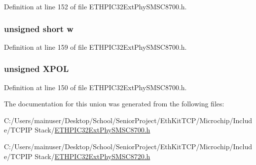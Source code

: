 Definition at line 152 of file E\+T\+H\+P\+I\+C32\+Ext\+Phy\+S\+M\+S\+C8700.\+h.

\hypertarget{union_____s_p_e_c_i_a_l_c_t_r_lbits__t_a160850a4684a3e82c2323033964f2e98}{}
\subsubsection[{w}]{\setlength{\rightskip}{0pt plus 5cm}unsigned short w}\label{union_____s_p_e_c_i_a_l_c_t_r_lbits__t_a160850a4684a3e82c2323033964f2e98}


Definition at line 159 of file E\+T\+H\+P\+I\+C32\+Ext\+Phy\+S\+M\+S\+C8700.\+h.

\hypertarget{union_____s_p_e_c_i_a_l_c_t_r_lbits__t_a95295a55abaebd3cb654ddc970a85c7a}{}
\subsubsection[{X\+P\+O\+L}]{\setlength{\rightskip}{0pt plus 5cm}unsigned X\+P\+O\+L}\label{union_____s_p_e_c_i_a_l_c_t_r_lbits__t_a95295a55abaebd3cb654ddc970a85c7a}


Definition at line 150 of file E\+T\+H\+P\+I\+C32\+Ext\+Phy\+S\+M\+S\+C8700.\+h.



The documentation for this union was generated from the following files\+:\begin{DoxyCompactItemize}
\item 
C\+:/\+Users/mainuser/\+Desktop/\+School/\+Senior\+Project/\+Eth\+Kit\+T\+C\+P/\+Microchip/\+Include/\+T\+C\+P\+I\+P Stack/\hyperlink{_e_t_h_p_i_c32_ext_phy_s_m_s_c8700_8h}{E\+T\+H\+P\+I\+C32\+Ext\+Phy\+S\+M\+S\+C8700.\+h}\item 
C\+:/\+Users/mainuser/\+Desktop/\+School/\+Senior\+Project/\+Eth\+Kit\+T\+C\+P/\+Microchip/\+Include/\+T\+C\+P\+I\+P Stack/\hyperlink{_e_t_h_p_i_c32_ext_phy_s_m_s_c8720_8h}{E\+T\+H\+P\+I\+C32\+Ext\+Phy\+S\+M\+S\+C8720.\+h}\end{DoxyCompactItemize}
